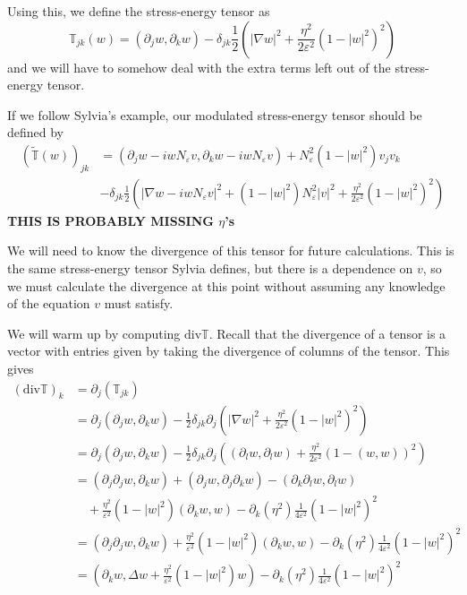 \documentclass[a4paper]{article}
\renewcommand{\div}{\mathrm{div}}
\begin{document}
Using this, we define the stress-energy tensor as
\begin{equation} \label{eqn:stress_energy}
  \mathbb{T}_{jk}(w) = (\partial_j w, \partial_k w) - \delta_{jk} \frac{1}{2} \left( |\nabla w|^2 + \frac{\eta^2}{2 \varepsilon^2} (1-|w|^2)^2 \right)
\end{equation}
and we will have to somehow deal with the extra terms left out of the stress-energy tensor.

If we follow Sylvia's example, our modulated stress-energy tensor should be defined by
\begin{align} \label{eqn:mod_stress_energy}
  (\tilde{\mathbb{T}}(w))_{jk} &= (\partial_j w- i w N_\varepsilon v, \partial_k w - i w N_\varepsilon v) + N_\varepsilon^2 (1 - |w|^2) v_j v_k
  \nonumber \\
  &- \delta_{jk} \frac{1}{2} \left( |\nabla w - i w N_\varepsilon v|^2 + (1-|w|^2) N_\varepsilon^2 |v|^2 + \frac{\eta^2}{2 \varepsilon^2} (1 - |w|^2)^2
  \right)
\end{align}
\textbf{THIS IS PROBABLY MISSING $\eta$'s}

We will need to know the divergence of this tensor for future calculations. This is the same stress-energy tensor Sylvia defines, but there is a
dependence on $v$, so we must calculate the divergence at this point without assuming any knowledge of the equation $v$ must satisfy.

We will warm up by computing $\div \mathbb{T}$. Recall that the divergence of a tensor is a vector with entries given by taking the divergence of
columns of the tensor. This gives
\begin{align}
  (\div \mathbb{T})_k &= \partial_j (\mathbb{T}_{jk}) \nonumber \\
  &= \partial_j (\partial_j w, \partial_k w) - \frac{1}{2} \delta_{jk} \partial_j \left( |\nabla w|^2 + \frac{\eta^2}{2 \varepsilon^2} (1-|w|^2)^2
  \right) \nonumber \\
  &= \partial_j (\partial_j w, \partial_k w) - \frac{1}{2} \delta_{jk} \partial_j \left( (\partial_l w, \partial_l w) + \frac{\eta^2}{2 \varepsilon^2}
  (1 - (w,w))^2 \right) \nonumber \\
  &= (\partial_j \partial_j w, \partial_k w) + (\partial_j w, \partial_j \partial_k w) - (\partial_k \partial_l w, \partial_l w) \nonumber \\
  &\quad + \frac{\eta^2}{\varepsilon^2} (1 - |w|^2) (\partial_k w, w) - \partial_k (\eta^2) \frac{1}{4 \varepsilon^2} (1 - |w|^2)^2 \nonumber \\
  &= (\partial_j \partial_j w, \partial_k w) + \frac{\eta^2}{\varepsilon^2} (1 - |w|^2) (\partial_k w, w) - \partial_k(\eta^2) \frac{1}{4
  \varepsilon^2} (1 - |w|^2)^2 \nonumber \\
  &= (\partial_k w, \Delta w + \frac{\eta^2}{\varepsilon^2} (1 - |w|^2)w) - \partial_k(\eta^2) \frac{1}{4\varepsilon^2} (1 - |w|^2)^2
  \label{eqn:div_stress_energy_comp}
\end{align}
\end{document}
